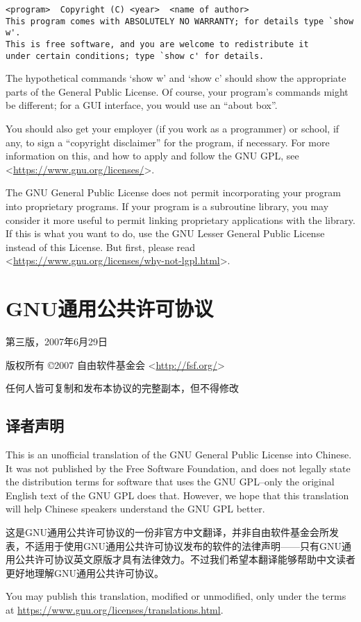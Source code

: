 \begin{verbatim}
<program>  Copyright (C) <year>  <name of author>
This program comes with ABSOLUTELY NO WARRANTY; for details type `show w'.
This is free software, and you are welcome to redistribute it
under certain conditions; type `show c' for details.
\end{verbatim}\par
The hypothetical commands `show w' and `show c' should show the appropriate parts of the General Public License. Of course, your program's commands might be different; for a GUI interface, you would use an “about box”.\par
You should also get your employer (if you work as a programmer) or school, if any, to sign a “copyright disclaimer” for the program, if necessary. For more information on this, and how to apply and follow the GNU GPL, see <\url{https://www.gnu.org/licenses/}>.\par
The GNU General Public License does not permit incorporating your program into proprietary programs. If your program is a subroutine library, you may consider it more useful to permit linking proprietary applications with the library. If this is what you want to do, use the GNU Lesser General Public License instead of this License. But first, please read <\url{https://www.gnu.org/licenses/why-not-lgpl.html}>.
\chapter{GNU通用公共许可协议}
\cite{gplzhs}
第三版，2007年6月29日\par
版权所有 \copyright 2007 自由软件基金会 <\url{http://fsf.org/}>\par
任何人皆可复制和发布本协议的完整副本，但不得修改\par
\section{译者声明}
This is an unofficial translation of the GNU General Public License into Chinese. It was not published by the Free Software Foundation, and does not legally state the distribution terms for software that uses the GNU GPL--only the original English text of the GNU GPL does that. However, we hope that this translation will help Chinese speakers understand the GNU GPL better.\par
这是GNU通用公共许可协议的一份非官方中文翻译，并非自由软件基金会所发表，不适用于使用GNU通用公共许可协议发布的软件的法律声明——只有GNU通用公共许可协议英文原版才具有法律效力。不过我们希望本翻译能够帮助中文读者更好地理解GNU通用公共许可协议。\par
You may publish this translation, modified or unmodified, only under the terms at \url{https://www.gnu.org/licenses/translations.html}.\par
